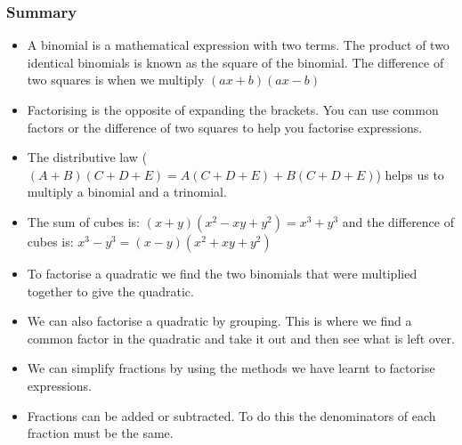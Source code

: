             \subsubsection{ Summary}
            \nopagebreak
            \label{m39392*uid0812}\begin{itemize}[noitemsep]
            \item A binomial is a mathematical expression with two terms. The product of two identical binomials is known as the square of the binomial. The difference of two squares is when we multiply
                $\left(ax+b\right)\left(ax-b\right)$\item Factorising is the opposite of expanding the brackets. You can use common factors or the difference of two squares to help you factorise expressions.\item The distributive law ($\left(A+B\right)\left(C+D+E\right)=A\left(C+D+E\right)+B\left(C+D+E\right)$) helps us to multiply a binomial and a trinomial.\item The sum of cubes is: $\left(x+y\right)\left({x}^{2}-xy+{y}^{2}\right)={x}^{3}+{y}^{3}$ and the difference of cubes is: ${x}^{3}-{y}^{3}=\left(x-y\right)\left({x}^{2}+xy+{y}^{2}\right)$\item To factorise a quadratic we find the two binomials that were multiplied together to give the quadratic.\item We can also factorise a quadratic by grouping. This is where we find a common factor in the quadratic and take it out and then see what is left over.\item We can simplify fractions by using the methods we have learnt to factorise expressions.\item Fractions can be added or subtracted. To do this the denominators of each fraction must be the same.\end{itemize}
        \label{m39392*cid8}
